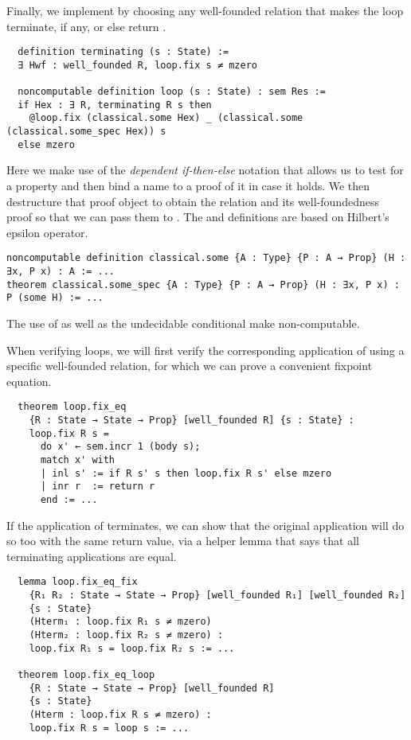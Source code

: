 Finally, we implement  by choosing any well-founded relation  that makes
the loop terminate, if any, or else return .

\begin{verbatim}
  definition terminating (s : State) :=
  ∃ Hwf : well_founded R, loop.fix s ≠ mzero

  noncomputable definition loop (s : State) : sem Res :=
  if Hex : ∃ R, terminating R s then
    @loop.fix (classical.some Hex) _ (classical.some (classical.some_spec Hex)) s
  else mzero
\end{verbatim}

Here we make use of the \emph{dependent if-then-else} notation that allows us to
test for a property and then bind a name to a proof of it in case it holds. We
then destructure that proof object to obtain the relation and its
well-foundedness proof so that we can pass them to . The
 and  definitions are based on
Hilbert's epsilon operator.

\begin{verbatim}
noncomputable definition classical.some {A : Type} {P : A → Prop} (H : ∃x, P x) : A := ...
theorem classical.some_spec {A : Type} {P : A → Prop} (H : ∃x, P x) : P (some H) := ...
\end{verbatim}

The use of  as well as the undecidable conditional
 make  non-computable.

When verifying loops, we will first verify the corresponding application of
 using a specific well-founded relation, for which we can prove a
convenient fixpoint equation.

\begin{verbatim}
  theorem loop.fix_eq
    {R : State → State → Prop} [well_founded R] {s : State} :
    loop.fix R s =
      do x' ← sem.incr 1 (body s);
      match x' with
      | inl s' := if R s' s then loop.fix R s' else mzero
      | inr r  := return r
      end := ...
\end{verbatim}

If the application of  terminates, we can show that the original
application  will do so too with the same return value,
via a helper lemma that says that all terminating  applications are equal.

\begin{verbatim}
  lemma loop.fix_eq_fix
    {R₁ R₂ : State → State → Prop} [well_founded R₁] [well_founded R₂]
    {s : State}
    (Hterm₁ : loop.fix R₁ s ≠ mzero)
    (Hterm₂ : loop.fix R₂ s ≠ mzero) :
    loop.fix R₁ s = loop.fix R₂ s := ...

  theorem loop.fix_eq_loop
    {R : State → State → Prop} [well_founded R]
    {s : State}
    (Hterm : loop.fix R s ≠ mzero) :
    loop.fix R s = loop s := ...
\end{verbatim}

